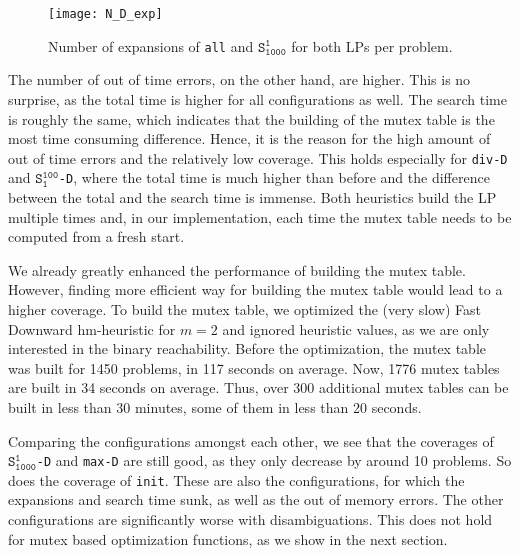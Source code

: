 \begin{figure}[h!]
\centering
\texttt{[image: N\_D\_exp]}
\caption{Number of expansions of \texttt{all} and $\texttt{S}_\texttt{1000}^\texttt{1}$ for both LPs per problem.}
\label{fig:N_D_exp}
\end{figure}

The number of out of time errors, on the other hand, are higher.
This is no surprise, as the total time is higher for all configurations as well.
The search time is roughly the same, which indicates that the building of the mutex table is the most time consuming difference.
Hence, it is the reason for the high amount of out of time errors and the relatively low coverage.
This holds especially for \texttt{div-D} and $\texttt{S}_\texttt{1}^\texttt{100}$\texttt{-D}, where the total time is much higher than before and the difference between the total and the search time is immense.
Both heuristics build the LP multiple times and, in our implementation, each time the mutex table needs to be computed from a fresh start.

We already greatly enhanced the performance of building the mutex table.
However, finding more efficient way for building the mutex table would lead to a higher coverage.
To build the mutex table, we optimized the (very slow) Fast Downward hm-heuristic for $m=2$ and ignored heuristic values, as we are only interested in the binary reachability.
Before the optimization, the mutex table was built for 1450 problems, in 117 seconds on average.
Now, 1776 mutex tables are built in 34 seconds on average.
Thus, over 300 additional mutex tables can be built in less than 30 minutes, some of them in less than 20 seconds.

Comparing the configurations amongst each other, we see that the coverages of $\texttt{S}_\texttt{1000}^\texttt{1}$\texttt{-D} and \texttt{max-D} are still good, as they only decrease by around 10 problems.
So does the coverage of \texttt{init}.
These are also the configurations, for which the expansions and search time sunk, as well as the out of memory errors.
The other configurations are significantly worse with disambiguations.
This does not hold for mutex based optimization functions, as we show in the next section.

